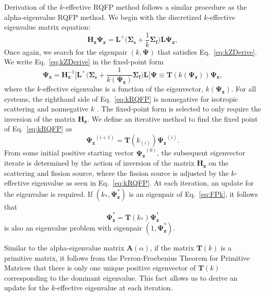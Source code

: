 Derivation of the $k$-effective RQFP method follows a similar procedure as the alpha-eigen\-value RQFP method. We begin with the discretized $k$-effective eigenvalue matrix equation:
\begin{equation}
	\mathbf{H_{z}} \mathbf{\Psi_{z}} = \mathbf{L}^{+} \bigg ( \mathbf{\Sigma_{s}} + \frac{1}{k}\mathbf{\Sigma_{f}} \bigg ) \mathbf{L} \mathbf{\Psi_{z}},
	\label{eq:kZDerive}
\end{equation}
Once again, we search for the eigenpair $(k, \mathbf{\Psi})$ that satisfies Eq.~\ref{eq:kZDerive}. We write Eq.~\ref{eq:kZDerive} in the fixed-point form
\begin{equation}
	\mathbf{\Psi_{z}} = \mathbf{H}^{-1}_{\mathbf{z}} \bigg [ \mathbf{L}^{+} \bigg ( \mathbf{\Sigma_{s}} + \frac{1}{k(\mathbf{\Psi_{z}})} \mathbf{\Sigma_{f}} \bigg ) \mathbf{L} \bigg ] \mathbf{\Psi} \equiv \mathbf{T}(k(\mathbf{\Psi_{z}})) \mathbf{\Psi_{z}},
	\label{eq:kRQFP}
\end{equation}
where the $k$-effective eigenvalue is a function of the eigenvector, $k(\mathbf{\Psi_{z}})$.
For all systems, the righthand side of Eq.~\ref{eq:kRQFP} is nonnegative for isotropic scattering and nonnegative $k$ \cite{warsa_krylov_2004}. The fixed-point form is selected to only require the inversion of the matrix $\mathbf{H}_{\mathbf{z}}$.
We define an iterative method to find the fixed point of Eq.~\ref{eq:kRQFP} as
\begin{equation}
	\mathbf{\Psi_{z}}^{(i+1)} = \mathbf{T}(k_{(i)}) \mathbf{\Psi_{z}}^{(i)}.
	\label{eq:FPk}
\end{equation}
From some initial positive starting vector $\mathbf{\Psi_{z}}^{(0)}$, the subsequent eigenvector iterate is determined by the action of inversion of the matrix $\mathbf{H_{z}}$ on the scattering and fission source, where the fission source is adjusted by the $k$-effective eigenvalue as seen in Eq.~\ref{eq:kRQFP}. At each iteration, an update for the eigenvalue is required. If $(k_{*},\mathbf{\Psi}_\mathbf{z}^{*})$ is an eigenpair of Eq.~\ref{eq:FPk}, it follows that
\begin{equation}
	\mathbf{\Psi}_\mathbf{z}^{*} = \mathbf{T}(k_{*}) \mathbf{\Psi}_\mathbf{z}^{*}
\end{equation}
is also an eigenvalue problem with eigenpair $(1,\mathbf{\Psi}_\mathbf{z}^{*})$.

Similar to the alpha-eigenvalue matrix $\mathbf{A}(\alpha)$, if the matrix $\mathbf{T}(k)$ is a primitive matrix, it follows from the Perron-Froebenius Theorem for Primitive Matrices that there is only one unique positive eigenvector of $\mathbf{T}(k)$ corresponding to the dominant eigenvalue. This fact allows us to derive an update for the $k$-effective eigenvalue at each iteration.

